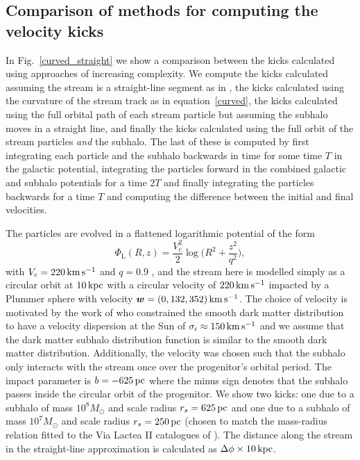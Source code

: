 \documentclass[useAMS,usenatbib,fleqn,a4paper]{mn2e}
\def\kpc{\,{\rm kpc}}
\def\pc{\,{\rm pc}}
\def\kms{\,{\rm km\,s^{-1}}}
\newcommand{\bs}[1]{\bmath{#1}}
\begin{document}
\subsection{Comparison of methods for computing the velocity kicks}\label{diff_methods}
In Fig.~\ref{curved_straight} we show a comparison between the kicks calculated using approaches of increasing complexity. We compute the kicks calculated assuming the stream is a straight-line segment as in \cite{ErkalBelokurov2015}, the kicks calculated using the curvature of the stream track as in equation~\eqref{curved}, the kicks calculated using the full orbital path of each stream particle but assuming the subhalo moves in a straight line, and finally the kicks calculated using the full orbit of the stream particles \emph{and} the subhalo. The last of these is computed by first integrating each particle and the subhalo backwards in time for some time $T$ in the galactic potential, integrating the particles forward in the combined galactic and subhalo potentials for a time $2T$ and finally integrating the particles backwards for a time $T$ and computing the difference between the initial and final velocities.

The particles are evolved in a flattened logarithmic potential of the form
\begin{equation}
\Phi_\mathrm{L}(R,z) = \frac{V_c^2}{2}\log\Big(R^2+\frac{z^2}{q^2}\Big),
\label{potential}
\end{equation}
with $V_c = 220\kms$ and $q = 0.9$ \citep{Koposov2010}, and the stream here is modelled simply as a circular orbit at $10\kpc$ with a circular velocity of $220\kms$ impacted by a Plummer sphere with velocity $\bs{w}=(0,132,352)\kms$. The choice of velocity is motivated by the work of \cite{PifflBinney} who constrained the smooth dark matter distribution to have a velocity dispersion at the Sun of $\sigma_i\approx150\kms$ and we assume that the dark matter subhalo distribution function is similar to the smooth dark matter distribution. Additionally, the velocity was chosen such that the subhalo only interacts with the stream once over the progenitor's orbital period. The impact parameter is $b=-625\pc$ where the minus sign denotes that the subhalo passes inside the circular orbit of the progenitor. We show two kicks: one due to a subhalo of mass $10^8M_\odot$ and scale radius $r_s=625\pc$ and one due to a subhalo of mass $10^7M_\odot$ and scale radius $r_s=250\pc$ (chosen to match the mass-radius relation fitted to the Via Lactea II catalogues of \cite{Diemand2008}). The distance along the stream in the straight-line approximation is calculated as $\Delta\phi\times10\kpc$.
\end{document}

